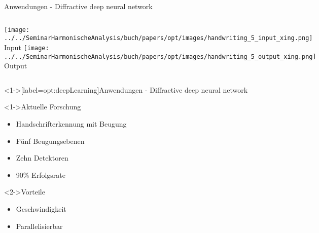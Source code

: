 \begin{frame}{Anwendungen - Diffractive deep neural network}
    \centering
    \begin{columns}
        \texttt{[image: ../../SeminarHarmonischeAnalysis/buch/papers/opt/images/handwriting\_5\_input\_xing.png]}
        Input
        \texttt{[image: ../../SeminarHarmonischeAnalysis/buch/papers/opt/images/handwriting\_5\_output\_xing.png]}
        Output
    \end{columns}
\end{frame}

\begin{frame}<1->[label=opt:deepLearning]{Anwendungen - Diffractive deep neural network}
    \begin{block}<1->{Aktuelle Forschung}
        \begin{itemize}
            \item<1-> Handschrifterkennung mit Beugung
            \item<1-> Fünf Beugungsebenen
            \item<1-> Zehn Detektoren
            \item<1-> 90\% Erfolgsrate
        \end{itemize}
    \end{block}
    \begin{block}<2->{Vorteile}
        \begin{itemize}
            \item<2-> Geschwindigkeit
            \item<2-> Parallelisierbar
        \end{itemize}
    \end{block}
\end{frame}
